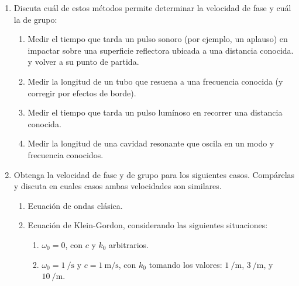 \documentclass[11pt,spanish]{article}
\begin{document}
\begin{enumerate}

\section*{Velocidad de grupo y de fase}


    \item Discuta cuál de estos métodos permite determinar
    la velocidad de fase y cuál la de grupo:

    \begin{enumerate}
        \item Medir el tiempo que tarda un pulso sonoro (por ejemplo, un
        aplauso) en impactar sobre una superficie reflectora ubicada a una
        distancia conocida. y volver a su punto de partida.

        \item Medir la longitud de un tubo que resuena a una frecuencia conocida
        (y corregir por efectos de borde).

        \item Medir el tiempo que tarda un pulso lumínoso en recorrer una
        distancia conocida.

        \item Medir la longitud de una cavidad resonante que oscila en un
        modo y frecuencia conocidos.
    \end{enumerate}


    \item Obtenga la velocidad de fase y de grupo para los siguientes casos.
    Compárelas y discuta en cuales casos ambas velocidades son similares.
    
    \begin{enumerate}
        \item Ecuación de ondas clásica.
        \item Ecuación de Klein-Gordon, considerando las siguientes situaciones:
        \begin{enumerate}
            \item $\omega_0 = 0$, con $c$ y $k_0$ arbitrarios.

            \item $\omega_0 = \SI{1}{\per\second}$ y $c=\SI{1}{\meter\per\second}$,
            con $k_0$ tomando los valores: $\SI{1}{\per\meter}$,
            $\SI{3}{\per\meter}$, y $\SI{10}{\per\meter}$.
        \end{enumerate}
    \end{enumerate}


\end{enumerate}
\end{document}
